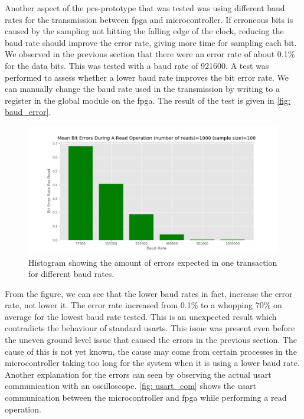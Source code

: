\documentclass[main.tex]{subfiles}
\begin{document}
Another aspect of the \gls{pcs}-prototype that was tested was using different baud rates for the transmission between \gls{fpga} and microcontroller. If erroneous bits is caused by the sampling not hitting the falling edge of the clock, reducing the baud rate should improve the error rate, giving more time for sampling each bit. We observed in the previous section that there were an error rate of about 0.1\% for the data bits. This was tested with a baud rate of 921600. A test was performed to assess whether a lower baud rate improves the bit error rate. We can manually change the baud rate used in the transmission by writing to a register in the global module on the \gls{fpga}. The result of the test is given in \autoref{fig: baud_error}.

\begin{figure}[!ht]
    \centering
    \includegraphics[width=18cm]{images/baud_error_rate.png}
    \caption{Histogram showing the amount of errors expected in one transaction for different baud rates.}
    \label{fig: baud_error}
\end{figure}
\FloatBarrier

From the figure, we can see that the lower baud rates in fact, increase the error rate, not lower it. The error rate increased from 0.1\% to a whopping 70\% on average for the lowest baud rate tested. This is an unexpected result which contradicts the behaviour of standard \gls{usart}s. This issue was present even before the uneven ground level issue that caused the errors in the previous section. The cause of this is not yet known, the cause may come from certain processes in the microcontroller taking too long for the system when it is using a lower baud rate. Another explanation for the errors can seen by observing the actual \gls{usart} communication with an oscilloscope. \autoref{fig: usart_com} shows the \gls{usart} communication between the microcontroller and \gls{fpga} while performing a read operation.
\end{document}
